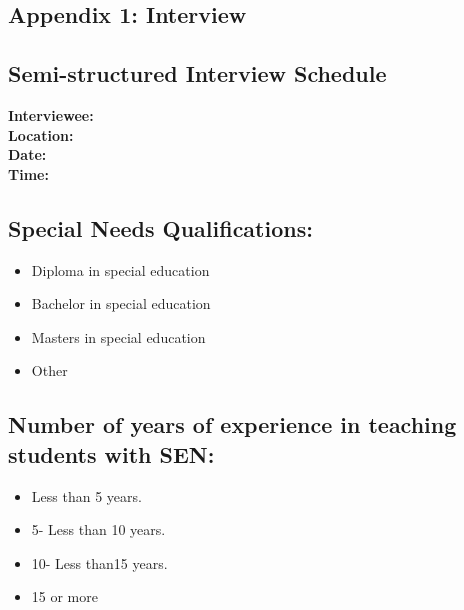 \documentclass[11.5pt]{sig-alternate}
\begin{document}
\begin{large}
\clearpage

\section*{Appendix 1: Interview}
\subsection*{Semi-structured Interview Schedule}
\textbf{Interviewee:}\\
\textbf{Location:}\\
\textbf{Date:}\\
\textbf{Time:}

\subsection*{Special Needs Qualifications: }
\begin{itemize}
\renewcommand{\labelitemi}{$\square$} 
  \item Diploma in special education 
  \item Bachelor in special education 
  \item Masters in special education 
  \item Other 
\end{itemize}

\subsection*{Number of years of experience in teaching students with SEN:}
\begin{itemize}
\renewcommand{\labelitemi}{$\square$} 
  \item Less than 5 years. 
  \item 5- Less than 10 years. 
  \item 10- Less than15 years. 
  \item 15 or more 
\end{itemize}


\end{large}
\end{document}
